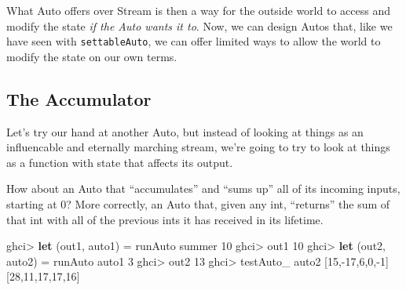 \documentclass[]{article}
\newenvironment{Shaded}{}{}
\newcommand{\CommentTok}[1]{\textcolor[rgb]{0.38,0.63,0.69}{\textit{#1}}}
\newcommand{\DataTypeTok}[1]{\textcolor[rgb]{0.56,0.13,0.00}{#1}}
\newcommand{\DecValTok}[1]{\textcolor[rgb]{0.25,0.63,0.44}{#1}}
\newcommand{\KeywordTok}[1]{\textcolor[rgb]{0.00,0.44,0.13}{\textbf{#1}}}
\newcommand{\NormalTok}[1]{#1}
\newcommand{\OperatorTok}[1]{\textcolor[rgb]{0.40,0.40,0.40}{#1}}
\newcommand{\OtherTok}[1]{\textcolor[rgb]{0.00,0.44,0.13}{#1}}
\begin{document}
What Auto offers over Stream is then a way for the outside world to access and
modify the state \emph{if the Auto wants it to}. Now, we can design Autos that,
like we have seen with \texttt{settableAuto}, we can offer limited ways to allow
the world to modify the state on our own terms.

\subsection{The Accumulator}\label{the-accumulator}

Let's try our hand at another Auto, but instead of looking at things as an
influencable and eternally marching stream, we're going to try to look at things
as a function with state that affects its output.

How about an Auto that ``accumulates'' and ``sums up'' all of its incoming
inputs, starting at 0? More correctly, an Auto that, given any int, ``returns''
the sum of that int with all of the previous ints it has received in its
lifetime.

\begin{Shaded}
\end{Shaded}

\begin{Shaded}
\begin{Highlighting}[]
\NormalTok{ghci}\OperatorTok{\textgreater{}} \KeywordTok{let}\NormalTok{ (out1, auto1) }\OtherTok{=}\NormalTok{ runAuto summer }\DecValTok{10}
\NormalTok{ghci}\OperatorTok{\textgreater{}}\NormalTok{ out1}
\DecValTok{10}
\NormalTok{ghci}\OperatorTok{\textgreater{}} \KeywordTok{let}\NormalTok{ (out2, auto2) }\OtherTok{=}\NormalTok{ runAuto auto1 }\DecValTok{3}
\NormalTok{ghci}\OperatorTok{\textgreater{}}\NormalTok{ out2}
\DecValTok{13}
\NormalTok{ghci}\OperatorTok{\textgreater{}}\NormalTok{ testAuto\_ auto2 [}\DecValTok{15}\NormalTok{,}\OperatorTok{{-}}\DecValTok{17}\NormalTok{,}\DecValTok{6}\NormalTok{,}\DecValTok{0}\NormalTok{,}\OperatorTok{{-}}\DecValTok{1}\NormalTok{]}
\NormalTok{[}\DecValTok{28}\NormalTok{,}\DecValTok{11}\NormalTok{,}\DecValTok{17}\NormalTok{,}\DecValTok{17}\NormalTok{,}\DecValTok{16}\NormalTok{]}
\end{Highlighting}
\end{Shaded}
\end{document}
